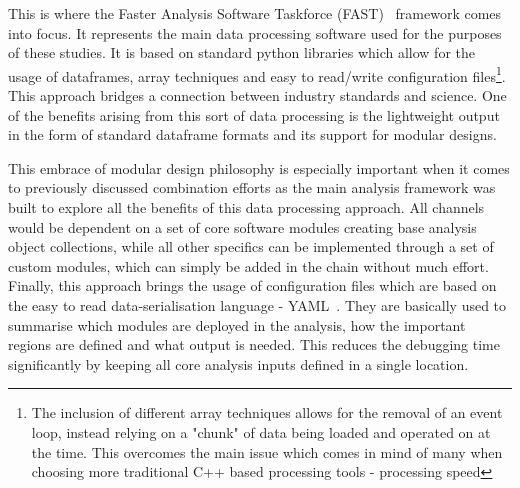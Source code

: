 

\hspace{10pt} This is where the Faster Analysis Software Taskforce (FAST)~\cite{twiki:fast} framework comes into focus. It represents the main data processing software used for the purposes of these studies. It is based on standard python libraries which allow for the usage of dataframes, array techniques and easy to read/write configuration files\footnote{The inclusion of different array techniques allows for the removal of an event loop, instead relying on a "chunk" of data being loaded and operated on at the time. This overcomes the main issue which comes in mind of many when choosing more traditional C++ based processing tools - processing speed}. This approach  bridges a connection between industry standards and science. One of the benefits arising from this sort of data processing is the lightweight output in the form of standard dataframe formats and its support for modular designs. 

\hspace{10pt} This embrace of modular design philosophy is especially important when it comes to previously discussed combination efforts as the main analysis framework was built to explore all the benefits of this data processing approach. All channels would be dependent on a set of core software modules creating base analysis object collections, while all other specifics can be implemented through a set of custom modules, which can simply be added in the chain without much effort. Finally, this approach brings the usage of configuration files which are based on the easy to read data-serialisation language - YAML~\cite{twiki:yaml}. They are basically used to summarise which modules are deployed in the analysis, how the important regions are defined and what output is needed. This reduces the debugging time significantly by keeping all core analysis inputs defined in a single location.


